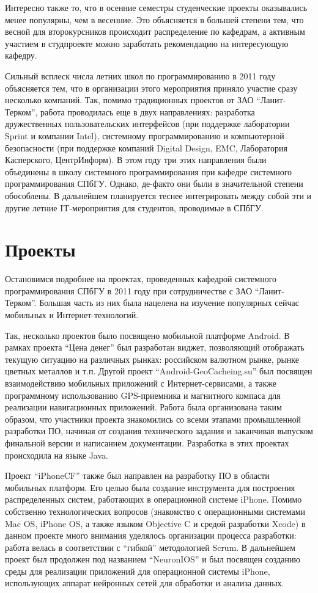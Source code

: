 \documentclass[a4paper]{article}
\begin{document}
Интересно также то, что в осенние семестры студенческие проекты оказывались менее популярны, чем в весенние. Это объясняется в большей степени тем, что весной для второкурсников происходит распределение по кафедрам, а активным участием в студпроекте можно заработать рекомендацию на интересующую кафедру. 

Сильный всплеск числа летних школ по программированию в 2011 году объясняется тем, что в организации этого мероприятия приняло участие сразу несколько компаний. Так, помимо традиционных проектов от ЗАО ``Ланит-Терком'', работа проводилась еще в двух направлениях: разработка дружественных пользовательских интерфейсов (при поддержке лаборатории Sprint и компании Intel), системному программированию и компьютерной безопасности (при поддержке компаний Digital Design, EMC, Лаборатория Касперского, ЦентрИнформ). В этом году три этих направления были объединены в школу системного программирования при кафедре системного программирования СПбГУ. Однако, де-факто они были в значительной степени обособлены. В дальнейшем планируется теснее интегрировать между собой эти и другие летние IT-мероприятия для студентов, проводимые в СПбГУ.

\section{Проекты}

Остановимся подробнее на проектах, проведенных кафедрой системного программирования СПбГУ в 2011 году при сотрудничестве с ЗАО ``Ланит-Терком''. Большая часть из них была нацелена на изучение популярных сейчас мобильных и Интернет-технологий.

Так, несколько проектов было посвящено мобильной платформе Android. В рамках проекта ``Цена денег'' был разработан виджет, позволяющий отображать текущую ситуацию на различных рынках: российском валютном рынке, рынке цветных металлов и т.п. Другой проект ``Android-GeoCacheing.su'' был посвящен взаимодействию мобильных приложений с Интернет-сервисами, а также программному использованию GPS-приемника и магнитного компаса для реализации навигационных приложений. Работа была организована таким образом, что участники проекта знакомились со всеми этапами промышленной разработки ПО, начиная от создания технического задания и заканчивая выпуском финальной версии и написанием документации. Разработка в этих проектах происходила на языке Java. 

Проект ``iPhoneCF'' также был направлен на разработку ПО в области мобильных платформ. Его целью была создание инструмента для построения распределенных систем, работающих в операционной системе iPhone. Помимо собственно технологических вопросов (знакомство с операционными системами Mac OS, iPhone OS, а также языком Objective C и средой разработки Xcode) в данном проекте много внимания уделялось организации процесса разработки: работа велась в соответствии с ``гибкой'' методологией Scrum. В дальнейшем проект был продолжен под названием ``NeuronIOS'' и был посвящен созданию среды для реализации приложений для операционной системы iPhone, использующих аппарат нейронных сетей для обработки и анализа данных.
\end{document}
